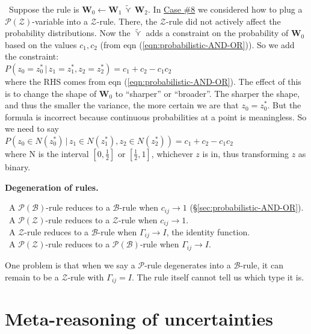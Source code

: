 \textbullet \, Suppose the rule is $ \mathbf{W}_0 \leftarrow \mathbf{W}_1 \, \widetilde{\curlyvee} \, \mathbf{W}_2 $.  In \hyperref[case8]{Case \#8} we considered how to plug a $\mathcal{P}(\mathcal{Z})$-variable into a $\mathcal{Z}$-rule.  There, the $\mathcal{Z}$-rule did not actively affect the probability distributions.  Now the $\widetilde{\curlyvee}$ adds a constraint on the probability of $\mathbf{W}_0$ based on the values $c_1, c_2$ (from eqn (\ref{eqn:probabilistic-AND-OR})).  So we add the constraint:\\
\hspace*{1cm} $ P(z_0 = z^*_0 \, | \, z_1 = z^*_1, z_2 = z^*_2) = c_1 + c_2 - c_1 c_2 $\\
where the RHS comes from eqn (\ref{eqn:probabilistic-AND-OR}).  The effect of this is to change the shape of $\mathbf{W}_0$ to ``sharper'' or ``broader''.  The sharper the shape, and thus the smaller the variance, the more certain we are that $z_0 = z^*_0$.  But the formula is incorrect because continuous probabilities at a point is meaningless.  So we need to say\\
\hspace*{1cm} $ P(z_0 \in N(z^*_0) \, | \, z_1 \in N(z^*_1), z_2 \in N(z^*_2)) = c_1 + c_2 - c_1 c_2 $\\
where N is the interval $[0,\frac{1}{2}]$ or $[\frac{1}{2},1]$, whichever $z$ is in, thus transforming $z$ as binary.

\textbf{Degeneration of rules.}

\textbullet \, A $\mathcal{P}(\mathcal{B})$-rule reduces to a $\mathcal{B}$-rule when $c_{ij} \rightarrow 1$ (\S\ref{sec:probabilistic-AND-OR}).\\
\textbullet \, A $\mathcal{P}(\mathcal{Z})$-rule reduces to a $\mathcal{Z}$-rule when $c_{ij} \rightarrow 1$.\\
\textbullet \, A $\mathcal{Z}$-rule reduces to a $\mathcal{B}$-rule when $\Gamma_{ij} \rightarrow I$, the identity function.\\
\textbullet \, A $\mathcal{P}(\mathcal{Z})$-rule reduces to a $\mathcal{P}(\mathcal{B})$-rule when $\Gamma_{ij} \rightarrow I$.

One problem is that when we say a $\mathcal{P}$-rule degenerates into a $\mathcal{B}$-rule, it can remain to be a $\mathcal{Z}$-rule with $\Gamma_{ij} = I$.  The rule itself cannot tell us which type it is.

\section{Meta-reasoning of uncertainties}

